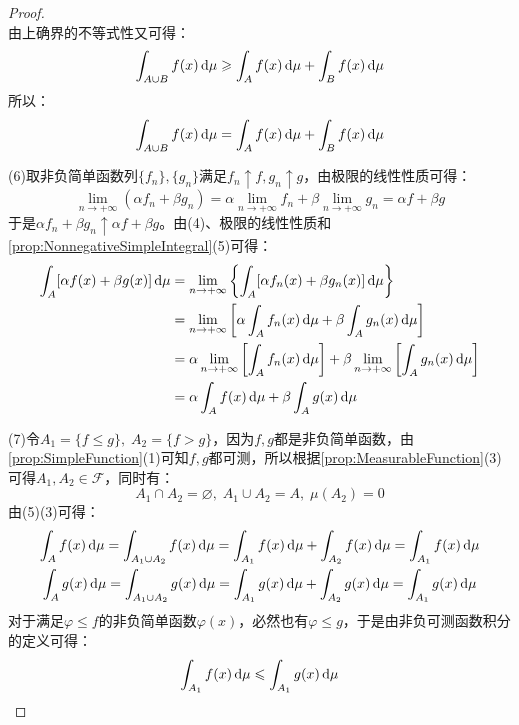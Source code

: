 \begin{proof}
\begin{equation*}
	\end{equation*}
	由上确界的不等式性又可得：
	\begin{equation*}
		\int_{A\cup B}f(x)\mathop{}\!\mathrm{d}\mu\geqslant\int_{A}f(x)\mathop{}\!\mathrm{d}\mu+\int_{B}f(x)\mathop{}\!\mathrm{d}\mu
	\end{equation*}
	所以：
	\begin{equation*}
		\int_{A\cup B}f(x)\mathop{}\!\mathrm{d}\mu=\int_{A}f(x)\mathop{}\!\mathrm{d}\mu+\int_{B}f(x)\mathop{}\!\mathrm{d}\mu
	\end{equation*}\par
	(6)取非负简单函数列$\{f_n\},\{g_n\}$满足$f_n\uparrow f,g_n\uparrow g$，由极限的线性性质可得：
	\begin{equation*}
		\lim_{n\to+\infty}(\alpha f_n+\beta g_n)=\alpha\lim_{n\to+\infty}f_n+\beta\lim_{n\to+\infty}g_n=\alpha f+\beta g
	\end{equation*}
	于是$\alpha f_n+\beta g_n\uparrow\alpha f+\beta g$。由(4)、极限的线性性质和\cref{prop:NonnegativeSimpleIntegral}(5)可得：
	\begin{align*}
		\int_{A}[\alpha f(x)+\beta g(x)]\dif\mu
		&=\lim_{n\to+\infty}\left\{\int_{A}[\alpha f_n(x)+\beta g_n(x)]\dif\mu\right\} \\
		&=\lim_{n\to+\infty}\left[\alpha\int_{A}f_n(x)\dif\mu+\beta\int_{A}g_n(x)\dif\mu\right] \\
		&=\alpha\lim_{n\to+\infty}\left[\int_{A}f_n(x)\dif\mu\right]+\beta\lim_{n\to+\infty}\left[\int_{A}g_n(x)\dif\mu\right] \\
		&=\alpha\int_{A}f(x)\dif\mu+\beta\int_{A}g(x)\dif\mu
	\end{align*}\par
	(7)令$A_1=\{f\leqslant g\},\;A_2=\{f>g\}$，因为$f,g$都是非负简单函数，由\cref{prop:SimpleFunction}(1)可知$f,g$都可测，所以根据\cref{prop:MeasurableFunction}(3)可得$A_1,A_2\in \mathscr{F}$，同时有：
	\begin{equation*}
		A_1\cap A_2=\varnothing,\;A_1\cup A_2=A,\;\mu(A_2)=0
	\end{equation*}
	由(5)(3)可得：
	\begin{gather*}
		\int_{A}f(x)\dif\mu=\int_{A_1\cup A_2}f(x)\dif\mu=\int_{A_1}f(x)\dif\mu+\int_{A_2}f(x)\dif\mu=\int_{A_1}f(x)\dif\mu \\
		\int_{A}g(x)\dif\mu=\int_{A_1\cup A_2}g(x)\dif\mu=\int_{A_1}g(x)\dif\mu+\int_{A_2}g(x)\dif\mu=\int_{A_1}g(x)\dif\mu
	\end{gather*}
	对于满足$\varphi\leqslant f$的非负简单函数$\varphi(x)$，必然也有$\varphi\leqslant g$，于是由非负可测函数积分的定义可得：
	\begin{equation*}
		\int_{A_1}f(x)\dif\mu\leqslant\int_{A_1}g(x)\dif\mu

\end{equation*}
\end{proof}
